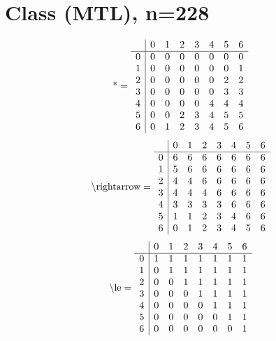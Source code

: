 \documentclass[11pt]{article}
\begin{document}
\section{Class (MTL), n=228}
\[\text{*} = 
\begin{array}{r | r r r r r r r}
 & 0 & 1 & 2 & 3 & 4 & 5 & 6 \\ \hline
0 & 0 & 0 & 0 & 0 & 0 & 0 & 0 \\
1 & 0 & 0 & 0 & 0 & 0 & 0 & 1 \\
2 & 0 & 0 & 0 & 0 & 0 & 2 & 2 \\
3 & 0 & 0 & 0 & 0 & 0 & 3 & 3 \\
4 & 0 & 0 & 0 & 0 & 4 & 4 & 4 \\
5 & 0 & 0 & 2 & 3 & 4 & 5 & 5 \\
6 & 0 & 1 & 2 & 3 & 4 & 5 & 6 \\
\end{array}
\]
\[\text{\textbackslash rightarrow} = 
\begin{array}{r | r r r r r r r}
 & 0 & 1 & 2 & 3 & 4 & 5 & 6 \\ \hline
0 & 6 & 6 & 6 & 6 & 6 & 6 & 6 \\
1 & 5 & 6 & 6 & 6 & 6 & 6 & 6 \\
2 & 4 & 4 & 6 & 6 & 6 & 6 & 6 \\
3 & 4 & 4 & 4 & 6 & 6 & 6 & 6 \\
4 & 3 & 3 & 3 & 3 & 6 & 6 & 6 \\
5 & 1 & 1 & 2 & 3 & 4 & 6 & 6 \\
6 & 0 & 1 & 2 & 3 & 4 & 5 & 6 \\
\end{array}
\]
\[\text{\textbackslash le} = 
\begin{array}{r | r r r r r r r}
 & 0 & 1 & 2 & 3 & 4 & 5 & 6 \\ \hline
0 & 1 & 1 & 1 & 1 & 1 & 1 & 1 \\
1 & 0 & 1 & 1 & 1 & 1 & 1 & 1 \\
2 & 0 & 0 & 1 & 1 & 1 & 1 & 1 \\
3 & 0 & 0 & 0 & 1 & 1 & 1 & 1 \\
4 & 0 & 0 & 0 & 0 & 1 & 1 & 1 \\
5 & 0 & 0 & 0 & 0 & 0 & 1 & 1 \\
6 & 0 & 0 & 0 & 0 & 0 & 0 & 1 \\
\end{array}
\]
\end{document}
